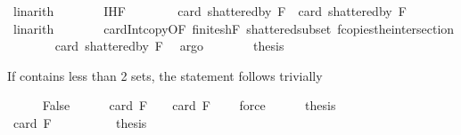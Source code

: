 \begin{isabellebody}
\ linarith\isanewline
\ \ \ \ \isamarkupfalse%
\ \isamarkupfalse%
\ IH{\isacharunderscore}{\kern0pt}F{}\isanewline
\ \ \ \ \isamarkupfalse%
\ {\isachardoublequoteopen}{\isachardot}{\kern0pt}{\isachardot}{\kern0pt}{\isachardot}{\kern0pt}\ {\isasymle}\ card\ {\isacharparenleft}{\kern0pt}shattered{\isacharunderscore}{\kern0pt}by\ {\isacharquery}{\kern0pt}F{}{\isacharparenright}{\kern0pt}\ {\isacharplus}{\kern0pt}\ card\ {\isacharparenleft}{\kern0pt}shattered{\isacharunderscore}{\kern0pt}by\ {\isacharquery}{\kern0pt}F{}{\isacharparenright}{\kern0pt}{\isachardoublequoteclose}\ \isamarkupfalse%
\ linarith\isanewline
\ \ \ \ \isamarkupfalse%
\ \isamarkupfalse%
\ card{\isacharunderscore}{\kern0pt}Int{\isacharunderscore}{\kern0pt}copy{\isacharbrackleft}{\kern0pt}OF\ finite{\isacharunderscore}{\kern0pt}shF\ shattered{\isacharunderscore}{\kern0pt}subset\ f{\isacharunderscore}{\kern0pt}copies{\isacharunderscore}{\kern0pt}the{\isacharunderscore}{\kern0pt}intersection{\isacharbrackright}{\kern0pt}\isanewline
\ \ \ \ \isamarkupfalse%
\ {\isachardoublequoteopen}{\isachardot}{\kern0pt}{\isachardot}{\kern0pt}{\isachardot}{\kern0pt}\ {\isasymle}\ card\ {\isacharparenleft}{\kern0pt}shattered{\isacharunderscore}{\kern0pt}by\ F{\isacharparenright}{\kern0pt}{\isachardoublequoteclose}\ \isamarkupfalse%
\ argo\isanewline
\ \ \ \ \isamarkupfalse%
\ \isamarkupfalse%
\ {\isacharquery}{\kern0pt}thesis\ \isacommand{{\isachardot}{\kern0pt}}\isamarkupfalse%
\isanewline
\ \ \isamarkupfalse%
%
\begin{isamarkuptext}%
If  contains less than 2 sets, the statement follows trivially%
\end{isamarkuptext}\isamarkuptrue%
\ \ \ \ \isamarkupfalse%
\ False\isanewline
\ \ \ \ \isamarkupfalse%
\ {\isachardoublequoteopen}card\ F\ {\isacharequal}{\kern0pt}\ {}\ {\isasymor}\ card\ F\ {\isacharequal}{\kern0pt}\ {}{\isachardoublequoteclose}\ \isamarkupfalse%
\ force\isanewline
\ \ \ \ \isamarkupfalse%
\ {\isacharquery}{\kern0pt}thesis\isanewline
\ \ \ \ \isamarkupfalse%
\isanewline
\ \ \ \ \ \ \isamarkupfalse%
\ {\isachardoublequoteopen}card\ F\ {\isacharequal}{\kern0pt}\ {}{\isachardoublequoteclose}\isanewline
\ \ \ \ \ \ \isamarkupfalse%
\ {\isacharquery}{\kern0pt}thesis\ \isamarkupfalse%

\end{isabellebody}
